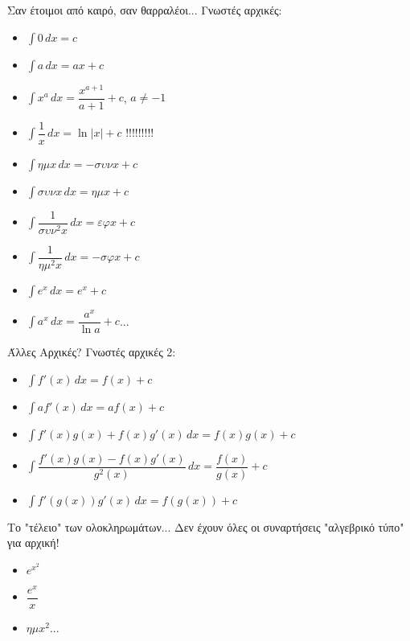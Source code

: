\documentclass{presentation}
\begin{document}
\begin{frame}{Σαν έτοιμοι από καιρό, σαν θαρραλέοι...}
    Γνωστές αρχικές:
    \begin{multicols}{2}
        \begin{itemize}[<+->]
            \item $\int 0 \, dx=c$
            \item $\int a \, dx=ax+c$
            \item $\int x^a \, dx=\dfrac{x^{a+1}}{a+1}+c$, $a\ne -1$
            \item $\int \dfrac{1}{x} \, dx=\ln|x|+c$ !!!!!!!!!
            \item $\int ημx \, dx=-συνx+c$
            \item $\int συνx \, dx=ημx+c$
            \item $\int \dfrac{1}{συν^2x} \, dx=εφx+c$
            \item $\int \dfrac{1}{ημ^2x} \, dx=-σφx+c$
            \item $\int e^x \, dx=e^x+c$
            \item $\int a^x \, dx=\dfrac{a^x}{\ln a}+c$...
        \end{itemize}
    \end{multicols}
\end{frame}

\begin{frame}{Άλλες Αρχικές?}
    Γνωστές αρχικές 2:
    \begin{itemize}[<+->]
        \item $\int f'(x) \, dx=f(x)+c$
        \item $\int af'(x) \, dx=af(x)+c$
        \item $\int f'(x)g(x)+f(x)g'(x) \, dx=f(x)g(x)+c$
        \item $\int \dfrac{f'(x)g(x)-f(x)g'(x)}{g^2(x)} \, dx=\dfrac{f(x)}{g(x)}+c$
        \item $\int f'(g(x))g'(x) \, dx=f(g(x))+c$
    \end{itemize}
\end{frame}

\begin{frame}{Το "τέλειο" των ολοκληρωμάτων...}
    Δεν έχουν όλες οι συναρτήσεις "αλγεβρικό τύπο" για αρχική!
    \begin{itemize}[<+->]
        \item $e^{x^2}$
        \item $\dfrac{e^x}{x}$
        \item $ημx^2$...
    \end{itemize}
\end{frame}
\end{document}
